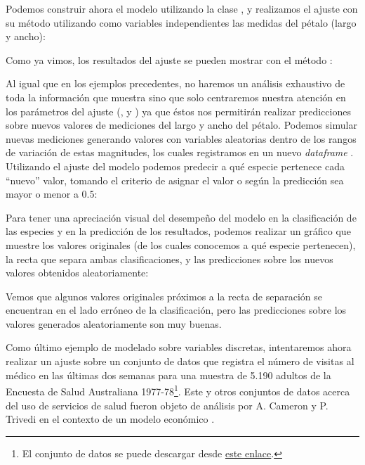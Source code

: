 
 Podemos construir ahora el modelo utilizando la clase , y realizamos el ajuste con su método  utilizando como variables independientes las medidas del pétalo (largo y ancho):


 Como ya vimos, los resultados del ajuste se pueden mostrar con el método :


 Al igual que en los ejemplos precedentes, no haremos un análisis exhaustivo de toda la información que muestra  sino que solo centraremos nuestra atención en los parámetros del ajuste (,  y ) ya que éstos nos permitirán realizar predicciones sobre nuevos valores de mediciones del largo y ancho del pétalo. Podemos simular nuevas mediciones generando valores con variables aleatorias dentro de los rangos de variación de estas magnitudes, los cuales registramos en un nuevo \textit{dataframe} . Utilizando el ajuste del modelo podemos predecir a qué especie pertenece cada ``nuevo'' valor, tomando el criterio de asignar el valor  o  según la predicción sea mayor o menor a $0.5$:


 Para tener una apreciación visual del desempeño del modelo en la clasificación de las especies y en la predicción de los resultados, podemos realizar un gráfico que muestre los valores originales (de los cuales conocemos a qué especie pertenecen), la recta que separa ambas clasificaciones, y las predicciones sobre los nuevos valores obtenidos aleatoriamente:


 Vemos que algunos valores originales próximos a la recta de separación se encuentran en el lado erróneo de la clasificación, pero las predicciones sobre los valores generados aleatoriamente son muy buenas.

 Como último ejemplo de modelado sobre variables discretas, intentaremos ahora realizar un ajuste sobre un conjunto de datos que registra el número de visitas al médico en las últimas dos semanas para una muestra de 5.190 adultos de la Encuesta de Salud Australiana 1977-78\footnote{El conjunto de datos se puede descargar desde \href{https://vincentarelbundock.github.io/Rdatasets/csv/AER/DoctorVisits.csv}{este enlace}.}. Este y otros conjuntos de datos acerca del uso de servicios de salud fueron objeto de análisis por A. Cameron y P. Trivedi en el contexto de un modelo económico \cite{cameron1986}.

